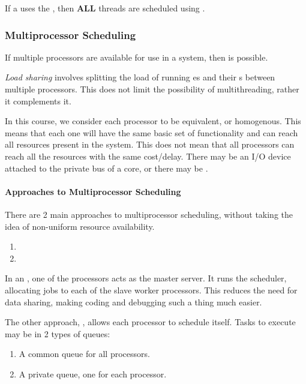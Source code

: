 If a  uses the , then \textbf{ALL} threads are scheduled using .

\subsubsection{Multiprocessor Scheduling}\label{subsubsec:Multiprocessor_Scheduling}
If multiple processors are available for use in a system, then  is possible.

\begin{definition}\label{def:Load_Sharing}
  \emph{Load sharing} involves splitting the load of running es and their s between multiple processors.
  This does not limit the possibility of multithreading, rather it complements it.
\end{definition}

In this course, we consider each processor to be equivalent, or homogenous.
This means that each one will have the same basic set of functionality and can reach all resources present in the system.
This does not mean that all processors can reach all the resources with the same cost/delay.
There may be an I/O device attached to the private bus of a core, or there may be .

\paragraph{Approaches to Multiprocessor Scheduling}\label{par:Multiprocessor_Scheuling_Approaches}
There are 2 main approaches to multiprocessor scheduling, without taking the idea of non-uniform resource availability.
\begin{enumerate}[noitemsep]
\item {}
\item {}
\end{enumerate}

In an , one of the processors acts as the master server.
It runs the scheduler, allocating jobs to each of the slave worker processors.
This reduces the need for data sharing, making coding and debugging such a thing much easier.

The other approach, , allows each processor to schedule itself.
Tasks to execute may be in 2 types of queues:
\begin{enumerate}[noitemsep]
\item A common queue for all processors.
\item A private queue, one for each processor.
\end{enumerate}

